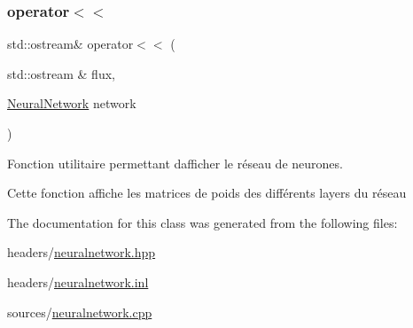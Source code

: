 \subsubsection{\texorpdfstring{operator$<$$<$}{operator<<}}
{\footnotesize\ttfamily std\+::ostream\& operator$<$$<$ (\begin{DoxyParamCaption}\item[{std\+::ostream \&}]{flux,  }\item[{\hyperlink{classNeuralNetwork}{Neural\+Network}}]{network }\end{DoxyParamCaption})\hspace{0.3cm}{\ttfamily [friend]}}



Fonction utilitaire permettant d\textquotesingle{}afficher le réseau de neurones. 

Cette fonction affiche les matrices de poids des différents layers du réseau 

The documentation for this class was generated from the following files\+:\begin{DoxyCompactItemize}
\item 
headers/\hyperlink{neuralnetwork_8hpp}{neuralnetwork.\+hpp}\item 
headers/\hyperlink{neuralnetwork_8inl}{neuralnetwork.\+inl}\item 
sources/\hyperlink{neuralnetwork_8cpp}{neuralnetwork.\+cpp}\end{DoxyCompactItemize}
